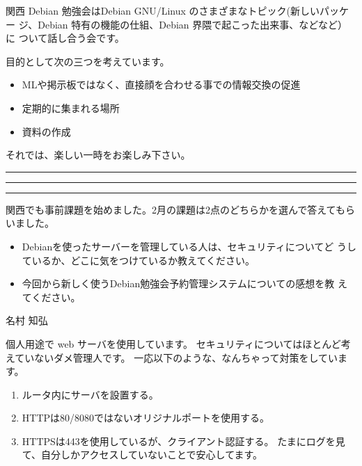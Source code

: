 \documentclass[mingoth,a4paper]{jsarticle}
\begin{document}
関西 Debian 勉強会はDebian GNU/Linux のさまざまなトピック(新しいパッケー
ジ、Debian 特有の機能の仕組、Debian 界隈で起こった出来事、などなど）に
ついて話し合う会です。

目的として次の三つを考えています。
\begin{itemize}
      \item MLや掲示板ではなく、直接顔を合わせる事での情報交換の促進
      \item 定期的に集まれる場所
      \item 資料の作成
\end{itemize}

それでは、楽しい一時をお楽しみ下さい。

\clearpage

\begin{minipage}[b]{0.2\hsize}
 {}
\end{minipage}
\begin{minipage}[b]{0.8\hsize}
\hrule
\vspace{2mm}
\hrule
\setcounter{tocdepth}{1}
\tableofcontents
\vspace{2mm}
\hrule
\end{minipage}


関西でも事前課題を始めました。2月の課題は2点のどちらかを選んで答えてもら
いました。

\begin{itemize}
 \item Debianを使ったサーバーを管理している人は、セキュリティについてど
       うしているか、どこに気をつけているか教えてください。
 \item 今回から新しく使うDebian勉強会予約管理システムについての感想を教
       えてください。
\end{itemize}

\begin{prework*}{ 名村 知弘 }

    個人用途で web サーバを使用しています。
    セキュリティについてはほとんど考えていないダメ管理人です。
    一応以下のような、なんちゃって対策をしています。
    \begin{enumerate}
          \item ルータ内にサーバを設置する。
          \item HTTPは80/8080ではないオリジナルポートを使用する。
          \item HTTPSは443を使用しているが、クライアント認証する。 
        たまにログを見て、自分しかアクセスしていないことで安心してます。
    \end{enumerate}
\end{prework*}
\end{document}
